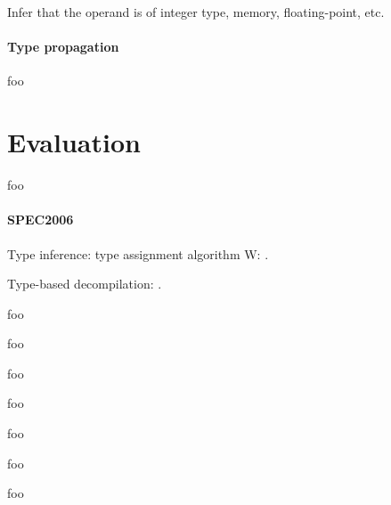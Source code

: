 \documentclass[10pt, a4paper, sigplan]{acmart}
\begin{document}

Infer that the operand is of integer type, memory, floating-point, etc.


\paragraph{Type propagation}

foo


\section{Evaluation}

foo



\paragraph{SPEC2006}


Type inference: type assignment algorithm W: \cite{milner_algorithmw}.

Type-based decompilation: \cite{mycroft_type_based_decompilation}.


foo \cite{reverse_engineering_of_types}

foo \cite{scalable_type_detection}

foo \cite{bintype}

foo \cite{type_inference_on_executables}

foo \cite{dynstruct}

foo \cite{polymorphic_type_inference_for_machine_code}



\clearpage

foo

\clearpage



%
\end{document}
